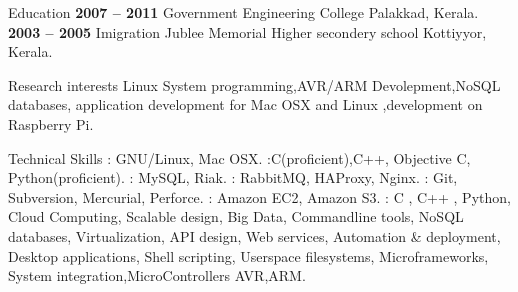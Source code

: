 \documentclass{resume}
\author{Tony Lijo Jose}
\begin{document}
\maketitle


\begin{category}{Education}
   \hfill \textbf{2007 -- 2011}
  \citemnobullet Government Engineering College Palakkad, Kerala.
   \hfill \textbf{2003 -- 2005}
  \citemnobullet Imigration Jublee Memorial Higher secondery school Kottiyyor, Kerala.
\end{category}


\begin{category}{Research interests}
  \citemnobullet Linux System programming,AVR/ARM Devolepment,NoSQL databases, application development for Mac OSX and Linux ,development on Raspberry Pi.
\end{category}

\begin{category}{Technical Skills}
  : GNU/Linux, Mac OSX.
  :C(proficient),C++, Objective C, Python(proficient).
  : MySQL, Riak.
  :  RabbitMQ, HAProxy, Nginx.
  : Git, Subversion, Mercurial, Perforce.
  :  Amazon EC2, Amazon S3.
  : C , C++ , Python, Cloud Computing, Scalable design, Big Data, Commandline 
  tools, NoSQL databases, Virtualization, API design, Web services, Automation \& deployment, 
  Desktop applications, Shell scripting, Userspace filesystems, Microframeworks, System integration,MicroControllers AVR,ARM.
\end{category}

\end{document}
